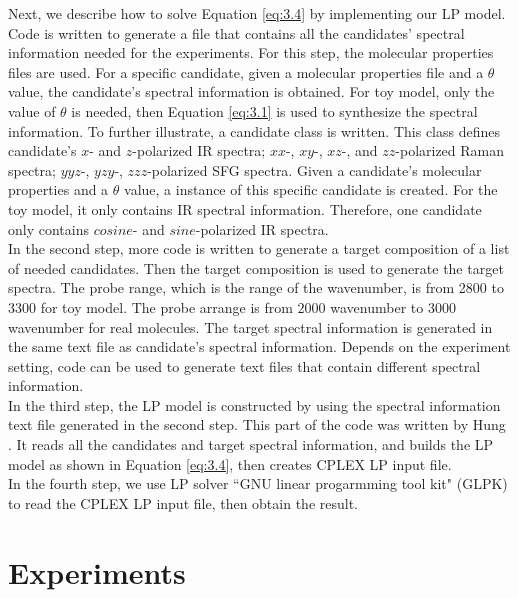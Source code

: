 Next, we describe how to solve Equation \ref{eq:3.4} by implementing our LP model. Code is written to generate a file that contains all the candidates' spectral information needed for the experiments. For this step, the molecular properties files are used. For a specific candidate, given a molecular properties file and a $\theta$ value, the candidate's spectral information is obtained. For toy model, only the value of $\theta$ is needed, then Equation \ref{eq:3.1} is used to synthesize the spectral information. To further illustrate, a candidate class is written. This class defines candidate's $x$- and $z$-polarized IR spectra; $xx$-, $xy$-, $xz$-, and $zz$-polarized Raman spectra; $yyz$-, $yzy$-, $zzz$-polarized SFG spectra. Given a candidate's molecular properties and a $\theta$ value, a instance of this specific candidate is created. For the toy model, it only contains IR spectral information. Therefore, one candidate only contains $cosine$- and $sine$-polarized IR spectra. \\

In the second step, more code is written to generate a target composition of a list of needed candidates. Then the target composition is used to generate the target spectra. The probe range, which is the range of the wavenumber, is from 2800 to 3300 for toy model. The probe arrange is from $2000$ wavenumber to $3000$ wavenumber for real molecules. The target spectral information is generated in the same text file as candidate's spectral information. Depends on the experiment setting, code can be used to generate text files that contain different spectral information. \\

In the third step, the LP model is constructed by using the spectral information text file generated in the second step. This part of the code was written by Hung \cite{KuoKaiHung:Thesis:2015}. It reads all the candidates and target spectral information, and builds the LP model as shown in Equation \ref{eq:3.4}, then creates CPLEX LP input file. \\

In the fourth step, we use LP solver ``GNU linear progarmming tool kit" (GLPK) to read the CPLEX LP input file, then obtain the result. \\

\section{Experiments}

